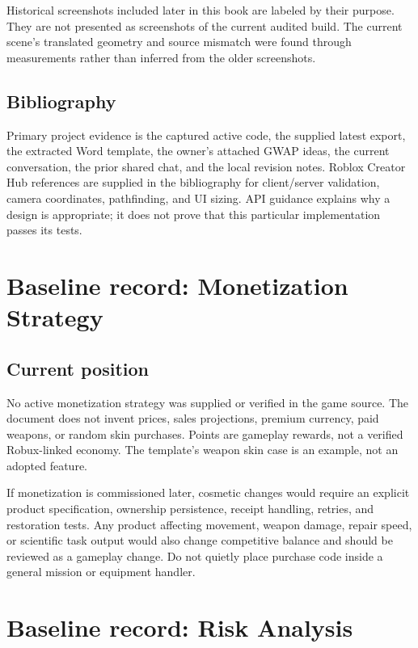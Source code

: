 Historical screenshots included later in this book are labeled by their purpose.\allowbreak{} They are not presented as screenshots of the current audited build.\allowbreak{} The current scene's translated geometry and source mismatch were found through measurements rather than inferred from the older screenshots.\allowbreak{}

\section{Bibliography}
Primary project evidence is the captured active code, the supplied latest export, the extracted Word template, the owner's attached GWAP ideas, the current conversation, the prior shared chat, and the local revision notes.\allowbreak{} Roblox Creator Hub references are supplied in the bibliography for client/\allowbreak{}server validation, camera coordinates, pathfinding, and UI sizing.\allowbreak{} API guidance explains why a design is appropriate; it does not prove that this particular implementation passes its tests.\allowbreak{}

\chapter{Baseline record: Monetization Strategy}
\section{Current position}
No active monetization strategy was supplied or verified in the game source.\allowbreak{} The document does not invent prices, sales projections, premium currency, paid weapons, or random skin purchases.\allowbreak{} Points are gameplay rewards, not a verified Robux-linked economy.\allowbreak{} The template's weapon skin case is an example, not an adopted feature.\allowbreak{}

If monetization is commissioned later, cosmetic changes would require an explicit product specification, ownership persistence, receipt handling, retries, and restoration tests.\allowbreak{} Any product affecting movement, weapon damage, repair speed, or scientific task output would also change competitive balance and should be reviewed as a gameplay change.\allowbreak{} Do not quietly place purchase code inside a general mission or equipment handler.\allowbreak{}

\chapter{Baseline record: Risk Analysis}
